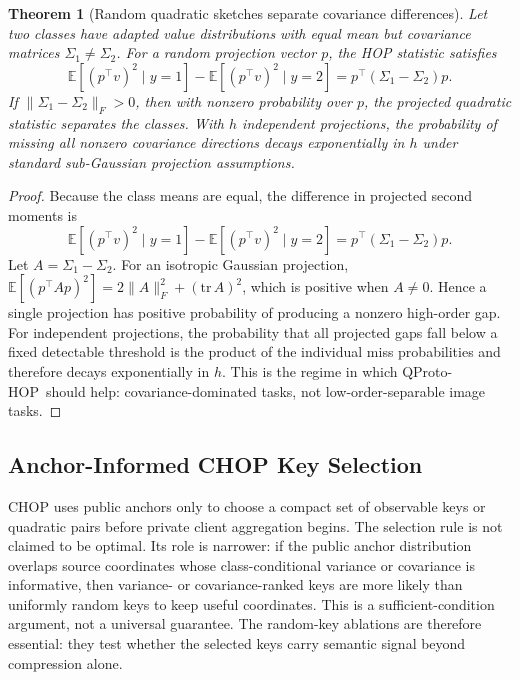 \documentclass[preprint]{elsarticle}
\newcommand{\hopmethod}{QProto-HOP}
\newcommand{\E}{\mathbb{E}}
\newtheorem{theorem}{Theorem}
\begin{document}
\begin{theorem}[Random quadratic sketches separate covariance differences]
Let two classes have adapted value distributions with equal mean but covariance matrices \(\Sigma_1\neq\Sigma_2\). For a random projection vector \(p\), the HOP statistic satisfies
\begin{equation}
    \E[(p^\top v)^2\mid y=1]
    -
    \E[(p^\top v)^2\mid y=2]
    =
    p^\top(\Sigma_1-\Sigma_2)p.
\end{equation}
If \(\|\Sigma_1-\Sigma_2\|_F>0\), then with nonzero probability over \(p\), the projected quadratic statistic separates the classes. With \(h\) independent projections, the probability of missing all nonzero covariance directions decays exponentially in \(h\) under standard sub-Gaussian projection assumptions.
\end{theorem}

\begin{proof}
Because the class means are equal, the difference in projected second moments is
\begin{equation}
    \E[(p^\top v)^2\mid y=1]-\E[(p^\top v)^2\mid y=2]
    =p^\top(\Sigma_1-\Sigma_2)p.
\end{equation}
Let \(A=\Sigma_1-\Sigma_2\). For an isotropic Gaussian projection, \(\E[(p^\top A p)^2]=2\|A\|_F^2+(\mathrm{tr}\,A)^2\), which is positive when \(A\neq0\). Hence a single projection has positive probability of producing a nonzero high-order gap. For independent projections, the probability that all projected gaps fall below a fixed detectable threshold is the product of the individual miss probabilities and therefore decays exponentially in \(h\). This is the regime in which \hopmethod\ should help: covariance-dominated tasks, not low-order-separable image tasks.
\end{proof}

\subsection{Anchor-Informed CHOP Key Selection}

CHOP uses public anchors only to choose a compact set of observable keys or quadratic pairs before private client aggregation begins. The selection rule is not claimed to be optimal. Its role is narrower: if the public anchor distribution overlaps source coordinates whose class-conditional variance or covariance is informative, then variance- or covariance-ranked keys are more likely than uniformly random keys to keep useful coordinates. This is a sufficient-condition argument, not a universal guarantee. The random-key ablations are therefore essential: they test whether the selected keys carry semantic signal beyond compression alone.
\end{document}
